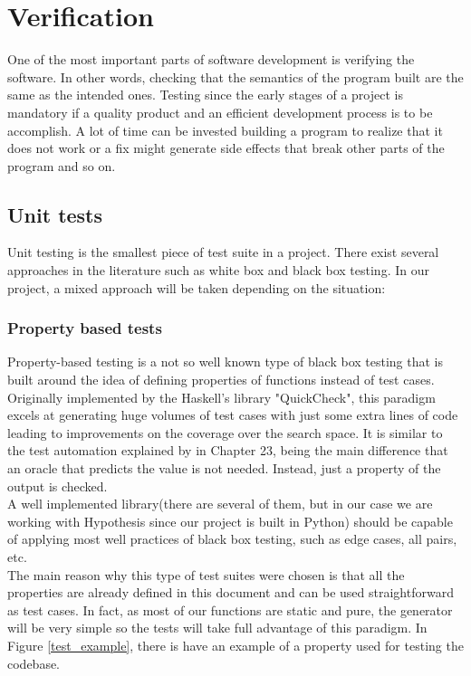 \section{Verification}
  One of the most important parts of software development is verifying the
  software. In other words, checking that the semantics of the program built
  are the same as the intended ones. Testing since the early stages of a project
  is mandatory if a quality product and an efficient development
  process is to be accomplish.  A lot of time can be invested building a
  program to realize that it does not work or a fix might generate side effects that break other
  parts of the program and so on.
  \subsection{Unit tests}

    Unit testing is the smallest piece of test suite in a project. There exist
    several approaches in the literature such as white box and black box
    testing. In our project, a mixed approach will be taken depending on the
    situation:

    \subsubsection{Property based tests}

    Property-based testing is a not so well known type of black box testing that
    is built around the idea of defining properties of functions instead of
    test cases. Originally implemented by the Haskell's library
    "QuickCheck"\cite{QuickCheck}, this paradigm excels at generating huge
    volumes of test cases with just some extra lines of code leading
    to improvements on the coverage over the search space. It is similar to the
    test automation explained by \citet{Sommerville} in Chapter 23, being the
    main difference that an oracle that predicts the value is not needed.
    Instead, just a property of the output is checked.\\

    A well implemented library(there are several of them, but in our case we are
    working with Hypothesis\cite{Hypothesis} since our project is built in
    Python) should be capable of applying most well practices of black box
    testing, such as edge cases, all pairs, etc.\\

    The main reason why this type of test suites were chosen is that all the
    properties are already defined in this document and can be used
    straightforward as test cases. In fact, as most of our functions
    are static and pure, the generator will be very simple so the
    tests will take full advantage of this paradigm. In Figure \ref{test_example},
    there is have an example of a property used for testing the codebase.\\


